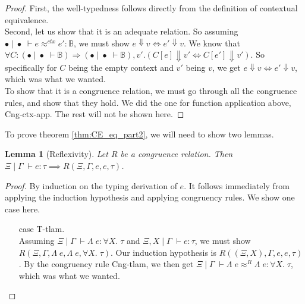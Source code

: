 \documentclass[a4paper, 11pt]{report}
\newtheorem{lemma}[theorem]{Lemma}
\theoremstyle{definition}
\newcommand{\expr}{e}
\newcommand{\val}{v}
\newcommand{\Tvar}{X}
\newcommand{\Tlam}{\Lambda\;}
\newcommand{\ctx}{C}
\newcommand{\Tbool}{\mathbb{B}}
\newcommand{\Tall}[2]{\forall #1.\; #2}
\newcommand{\typ}{\tau}
\newcommand{\venv}{\Gamma}
\newcommand{\tenv}{\Xi}
\newcommand{\emptenv}{\bullet}
\newcommand{\empvenv}{\bullet}
\newcommand{\jdg}[4]{#1 \; | \; #2 \; \vdash #3 : #4}
\newcommand{\jdgType}[3]{#1 \; | \; #2 \; \vdash #3}
\newcommand{\jdgRel}[6]{#1 \; | \; #2 \; \vdash #3 \approx^{#4} #5 : #6}
\newcommand{\ctxRel}[5]{\jdgRel{#1}{#2}{#3}{ctx}{#4}{#5}}
\begin{document}
\begin{proof}
  First, the well-typedness follows directly from the definition of contextual equivalence.\\
  Second, let us show that it is an adequate relation. So assuming $\ctxRel{\emptenv}{\empvenv}{\expr}{\expr'}{\Tbool}$, we must show $\expr \Downarrow \val \iff \expr' \Downarrow \val$. We know that $\forall \ctx : (\jdgType{\emptenv}{\empvenv}{\Tbool}) \Rightarrow (\jdgType{\emptenv}{\empvenv}{\Tbool}), \val' . (\ctx[\expr] \Downarrow \val' \iff \ctx[\expr'] \Downarrow \val')$. So specifically for $C$ being the empty context and $\val'$ being $\val$, we get $\expr \Downarrow \val \iff \expr' \Downarrow \val$, which was what we wanted.\\
  To show that it is a congruence relation, we must go through all the congruence rules, and show that they hold. We did the one for function application above, Cng-ctx-app. The rest will not be shown here.
\end{proof}

To prove theorem \ref{thm:CE_eq_part2}, we will need to show two lemmas.
\begin{lemma}[Reflexivity]\label{lem:R_Cng_is_reflexive}
  Let $R$ be a congruence relation. Then $\jdg{\tenv}{\venv}{\expr}{\typ} \implies R(\tenv, \venv, \expr, \expr, \typ)$.
\end{lemma}
\begin{proof}
  By induction on the typing derivation of $\expr$. It follows immediately from applying the induction hypothesis and applying congruency rules. We show one case here.
  \begin{itemize}
    \item[case] T-tlam.\\
      Assuming $\jdg{\tenv}{\venv}{\Tlam \expr}{\Tall{\Tvar}{\typ}}$ and $\jdg{\tenv, \Tvar}{\venv}{\expr}{\typ}$, we must show $R(\tenv, \venv, \Tlam \expr, \Tlam \expr, \Tall{\Tvar}{\typ})$. Our induction hypothesis is $R((\tenv, \Tvar), \venv, \expr, \expr, \typ)$. By the congruency rule Cng-tlam, we then get $\jdgRel{\tenv}{\venv}{\Tlam \expr}{R}{\Tlam \expr}{\Tall{\Tvar}{\typ}}$, which was what we wanted.
  \end{itemize}
\end{proof}
\end{document}
